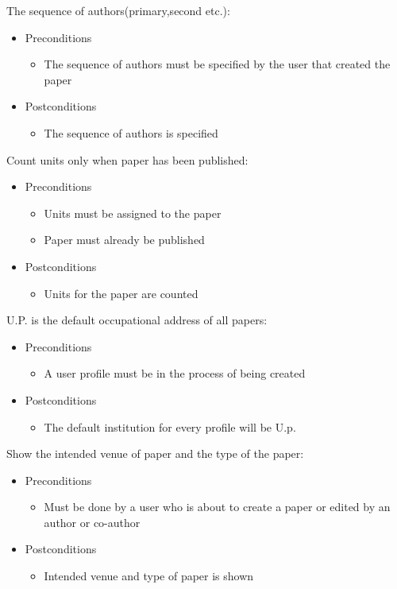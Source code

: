 \documentclass[a4paper,12pt]{article}
\begin{document}
The sequence of authors(primary,second etc.):
\begin{itemize}
    \item Preconditions
    \begin{itemize}
        \item The sequence of authors must be specified by the user that created the paper
    \end{itemize}
    \item Postconditions
    \begin{itemize}
        \item The sequence of authors is specified
    \end{itemize}
\end{itemize}
Count units only when paper has been published:
\begin{itemize}
    \item Preconditions
    \begin{itemize}
        \item Units must be assigned to the paper
        \item Paper must already be published
    \end{itemize}
    \item Postconditions
    \begin{itemize}
        \item Units for the paper are counted
    \end{itemize}
\end{itemize}
U.P. is the default occupational address of all papers:
\begin{itemize}
    \item Preconditions
    \begin{itemize}
        \item A user profile must be in the process of being created
    \end{itemize}
    \item Postconditions
    \begin{itemize}
        \item The default institution for every profile will be U.p.
    \end{itemize}
\end{itemize}
Show the intended venue of paper and the type of the paper:
\begin{itemize}
    \item Preconditions
    \begin{itemize}
        \item Must be done by a user who is about to create a paper or edited by an author or co-author
    \end{itemize}
    \item Postconditions
    \begin{itemize}
        \item Intended venue and type of paper is shown
    \end{itemize}

\end{itemize}
\end{document}
